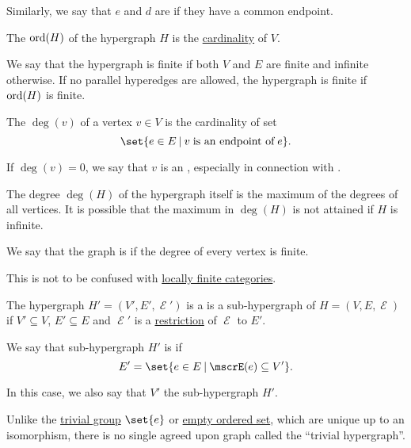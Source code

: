 \begin{definition}
\begin{thmenum}
    Similarly, we say that \( e \) and \( d \) are  if they have a common endpoint.

     The  \( \operatorname{ord}(H) \) of the hypergraph \( H \) is the \hyperref[thm:cardinality_existence]{cardinality} of \( V \).

    We say that the hypergraph is finite if both \( V \) and \( E \) are finite and infinite otherwise. If no parallel hyperedges are allowed, the hypergraph is finite if \( \operatorname{ord}(H) \) is finite.

     The  \( \deg(v) \) of a vertex \( v \in V \) is the cardinality of set
    \begin{equation*}
      \set{ e \in E \given v \T{is an endpoint of} e }.
    \end{equation*}

    If \( \deg(v) = 0 \), we say that \( v \) is an , especially in connection with .

    The degree \( \deg(H) \) of the hypergraph itself is the maximum of the degrees of all vertices. It is possible that the maximum in \( \deg(H) \) is not attained if \( H \) is infinite.

    We say that the graph is  if the degree of every vertex is finite.

    This is not to be confused with \hyperref[def:category_size]{locally finite categories}.

     The hypergraph \( H' = (V', E', \mscrE') \) is a is a sub-hypergraph of \( H = (V, E, \mscrE) \) if \( V' \subseteq V \), \( E' \subseteq E \) and \( \mscrE' \) is a \hyperref[def:multi_valued_function/restriction]{restriction} of \( \mscrE \) to \( E' \).

    We say that sub-hypergraph \( H' \) is  if
    \begin{equation}\label{eq:def:hypergraph/submodel/full}
      E' = \set{ e \in E \given \mscrE(e) \subseteq V' }.
    \end{equation}

    In this case, we also say that \( V' \)  the sub-hypergraph \( H' \).

     Unlike the \hyperref[def:group/trivial]{trivial group} \( \set{ e } \) or \hyperref[def:partially_ordered_set/trivial]{empty ordered set}, which are unique up to an isomorphism, there is no single agreed upon graph called the \enquote{trivial hypergraph}.


\end{thmenum}
\end{definition}
